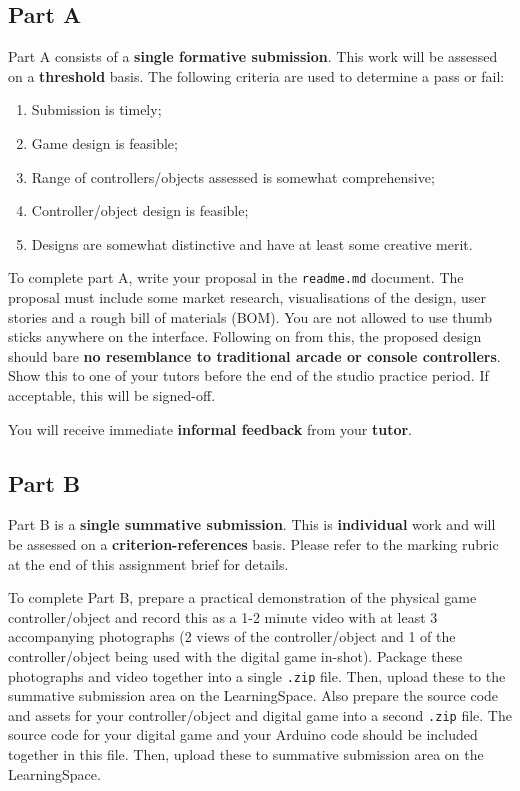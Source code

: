 \documentclass{../../fal_assignment}
\begin{document}
\subsection*{Part A}

Part A consists of a \textbf{single formative submission}. This work will be assessed on a \textbf{threshold} basis. The following criteria are used to determine a pass or fail:

\begin{enumerate}[label=(\alph*)]
	\item Submission is timely;
	\item Game design is feasible;
	\item Range of controllers/objects assessed is somewhat comprehensive;
	\item Controller/object design is feasible;
	\item Designs are somewhat distinctive and have at least some creative merit.
\end{enumerate}

To complete part A, write your proposal in the \texttt{readme.md} document. The proposal must include some market research, visualisations of the design, user stories and a rough bill of materials (BOM). You are not allowed to use thumb sticks anywhere on the interface. Following on from this, the proposed design should bare \textbf{no resemblance to traditional arcade or console controllers}. Show this to one of your tutors before the end of the studio practice period. If acceptable, this will be signed-off.

You will receive immediate \textbf{informal feedback} from your \textbf{tutor}.

\subsection*{Part B}

Part B is a \textbf{single summative submission}. This is \textbf{individual} work and will be assessed on a \textbf{criterion-references} basis. Please refer to the marking rubric at the end of this assignment brief for details.

To complete Part B, prepare a practical demonstration of the physical game controller/object and record this as a 1-2 minute video with at least 3 accompanying photographs (2 views of the controller/object and 1 of the controller/object being used with the digital game in-shot). Package these photographs and video together into a single \texttt{.zip} file. Then, upload these to the summative submission area on the LearningSpace. Also prepare the source code and assets for your controller/object and digital game into a second \texttt{.zip} file. The source code for your digital game and your Arduino code should be included together in this file. Then, upload these to summative submission area on the LearningSpace. 
\end{document}
